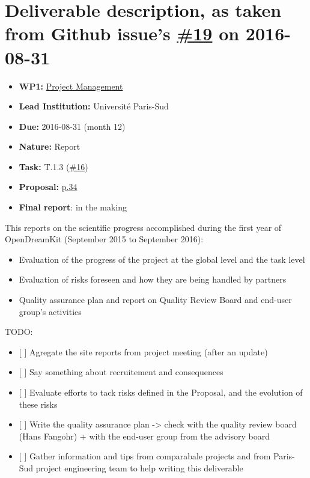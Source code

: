 \section*{\texorpdfstring{Deliverable description, as taken from Github
issue's
\href{https://github.com/OpenDreamKit/OpenDreamKit/issues/19}{\#19} on
2016-08-31}{Deliverable description, as taken from Github issue's \#19 on 2016-08-31}}\label{deliverable-description-as-taken-from-github-issues-19-on-2016-08-31}

\begin{itemize}
\tightlist
\item
  \textbf{WP1:}
  \href{https://github.com/OpenDreamKit/OpenDreamKit/tree/master/WP1}{Project
  Management}
\item
  \textbf{Lead Institution:} Université Paris-Sud
\item
  \textbf{Due:} 2016-08-31 (month 12)
\item
  \textbf{Nature:} Report
\item
  \textbf{Task:} T.1.3
  (\href{https://github.com/OpenDreamKit/OpenDreamKit/issues/16}{\#16})
\item
  \textbf{Proposal:}
  \href{https://github.com/OpenDreamKit/OpenDreamKit/raw/master/Proposal/proposal-www.pdf}{p.34}
\item
  \textbf{Final report}: in the making
\end{itemize}

This reports on the scientific progress accomplished during the first
year of OpenDreamKit (September 2015 to September 2016):

\begin{itemize}
\tightlist
\item
  Evaluation of the progress of the project at the global level and the
  task level
\item
  Evaluation of risks foreseen and how they are being handled by
  partners
\item
  Quality assurance plan and report on Quality Review Board and end-user
  group's activities
\end{itemize}

TODO:

\begin{itemize}
\tightlist
\item
  {[} {]} Agregate the site reports from project meeting (after an
  update)
\item
  {[} {]} Say something about recruitement and consequences
\item
  {[} {]} Evaluate efforts to tack risks defined in the Proposal, and
  the evolution of these risks
\item
  {[} {]} Write the quality assurance plan -\textgreater{} check with
  the quality review board (Hans Fangohr) + with the end-user group from
  the advisory board
\item
  {[} {]} Gather information and tips from comparabale projects and from
  Paris-Sud project engineering team to help writing this deliverable
\end{itemize}
